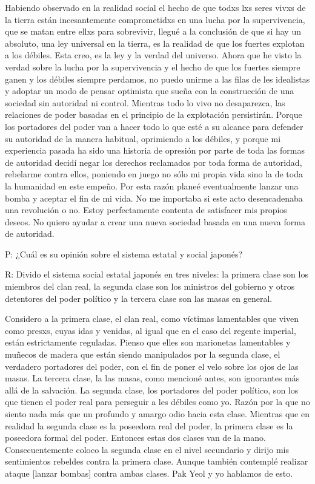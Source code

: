 \documentclass[
]{book}
\begin{document}
Habiendo observado en la realidad social el hecho de que todxs lxs seres vivxs de la tierra están incesantemente comprometidxs en una lucha por la supervivencia, que se matan entre ellxs para sobrevivir, llegué a la conclusión de que si hay un absoluto, una ley universal en la tierra, es la realidad de que los fuertes explotan a los débiles. Esta creo, es la ley y la verdad del universo. Ahora que he visto la verdad sobre la lucha por la supervivencia y el hecho de que los fuertes siempre ganen y los débiles siempre perdamos, no puedo unirme a las filas de les idealistas y adoptar un modo de pensar optimista que sueña con la construcción de una sociedad sin autoridad ni control. Mientras todo lo vivo no desaparezca, las relaciones de poder basadas en el principio de la explotación persistirán. Porque los portadores del poder van a hacer todo lo que esté a su alcance para defender su autoridad de la manera habitual, oprimiendo a los débiles, y porque mi experiencia pasada ha sido una historia de opresión por parte de toda las formas de autoridad decidí negar los derechos reclamados por toda forma de autoridad, rebelarme contra ellos, poniendo en juego no sólo mi propia vida sino la de toda la humanidad en este empeño.
Por esta razón planeé eventualmente lanzar una bomba y aceptar el fin de mi vida. No me importaba si este acto desencadenaba una revolución o no. Estoy perfectamente contenta de satisfacer mis propios deseos. No quiero ayudar a crear una nueva sociedad basada en una nueva forma de autoridad.

P: ¿Cuál es su opinión sobre el sistema estatal y social japonés?

R: Divido el sistema social estatal japonés en tres niveles: la primera clase son los miembros del clan real, la segunda clase son los ministros del gobierno y otros detentores del poder político y la tercera clase son las masas en general.

Considero a la primera clase, el clan real, como víctimas lamentables que viven como presxs, cuyas idas y venidas, al igual que en el caso del regente imperial, están estrictamente reguladas. Pienso que elles son marionetas lamentables y muñecos de madera que están siendo manipulados por la segunda clase, el verdadero portadores del poder, con el fin de poner el velo sobre los ojos de las masas. La tercera clase, la las masas, como mencioné antes, son ignorantes más allá de la salvación. La segunda clase, los portadores del poder político, son los que tienen el poder real para perseguir a les débiles como yo. Razón por la que no siento nada más que un profundo y amargo odio hacia esta clase. Mientras que en realidad la segunda clase es la poseedora real del poder, la primera clase es la poseedora formal del poder. Entonces estas dos clases van de la mano. Consecuentemente coloco la segunda clase en el nivel secundario y dirijo mis sentimientos rebeldes contra la primera clase. Aunque también contemplé realizar ataque {[}lanzar bombas{]} contra ambas clases.
Pak Yeol y yo hablamos de esto.
\end{document}
